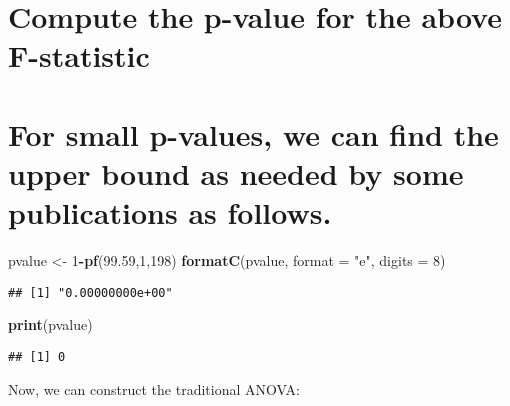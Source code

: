 \documentclass[]{article}
\newenvironment{Shaded}{\begin{snugshade}}{\end{snugshade}}
\newcommand{\KeywordTok}[1]{\textcolor[rgb]{0.13,0.29,0.53}{\textbf{#1}}}
\newcommand{\DataTypeTok}[1]{\textcolor[rgb]{0.13,0.29,0.53}{#1}}
\newcommand{\DecValTok}[1]{\textcolor[rgb]{0.00,0.00,0.81}{#1}}
\newcommand{\FloatTok}[1]{\textcolor[rgb]{0.00,0.00,0.81}{#1}}
\newcommand{\StringTok}[1]{\textcolor[rgb]{0.31,0.60,0.02}{#1}}
\newcommand{\OperatorTok}[1]{\textcolor[rgb]{0.81,0.36,0.00}{\textbf{#1}}}
\newcommand{\NormalTok}[1]{#1}
\begin{document}
\section{Compute the p-value for the above
F-statistic}\label{compute-the-p-value-for-the-above-f-statistic}

\section{For small p-values, we can find the upper bound as needed by
some publications as
follows.}\label{for-small-p-values-we-can-find-the-upper-bound-as-needed-by-some-publications-as-follows.}

\begin{Shaded}
\begin{Highlighting}[]
\NormalTok{pvalue <-}\StringTok{ }\DecValTok{1}\OperatorTok{-}\KeywordTok{pf}\NormalTok{(}\FloatTok{99.59}\NormalTok{,}\DecValTok{1}\NormalTok{,}\DecValTok{198}\NormalTok{)}
\KeywordTok{formatC}\NormalTok{(pvalue, }\DataTypeTok{format =} \StringTok{"e"}\NormalTok{, }\DataTypeTok{digits =} \DecValTok{8}\NormalTok{)}
\end{Highlighting}
\end{Shaded}

\begin{verbatim}
## [1] "0.00000000e+00"
\end{verbatim}

\begin{Shaded}
\begin{Highlighting}[]
\KeywordTok{print}\NormalTok{(pvalue)}
\end{Highlighting}
\end{Shaded}

\begin{verbatim}
## [1] 0
\end{verbatim}

Now, we can construct the traditional ANOVA:

\begin{Shaded}
\end{Shaded}
\end{document}
